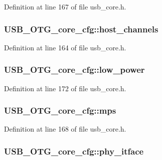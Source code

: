 Definition at line 167 of file usb\-\_\-core.\-h.

\hypertarget{struct_u_s_b___o_t_g__core__cfg_ac8f7d81fd5b4d38828bbed6a7a6bb350}{
\subsubsection[{host\-\_\-channels}]{ U\-S\-B\-\_\-\-O\-T\-G\-\_\-core\-\_\-cfg\-::host\-\_\-channels}}\label{struct_u_s_b___o_t_g__core__cfg_ac8f7d81fd5b4d38828bbed6a7a6bb350}


Definition at line 164 of file usb\-\_\-core.\-h.

\hypertarget{struct_u_s_b___o_t_g__core__cfg_a215bf00bd42b18f4a76c514b298a09ce}{
\subsubsection[{low\-\_\-power}]{ U\-S\-B\-\_\-\-O\-T\-G\-\_\-core\-\_\-cfg\-::low\-\_\-power}}\label{struct_u_s_b___o_t_g__core__cfg_a215bf00bd42b18f4a76c514b298a09ce}


Definition at line 172 of file usb\-\_\-core.\-h.

\hypertarget{struct_u_s_b___o_t_g__core__cfg_a02b0cfc0fde1fd37e24f00cd98580fdc}{
\subsubsection[{mps}]{ U\-S\-B\-\_\-\-O\-T\-G\-\_\-core\-\_\-cfg\-::mps}}\label{struct_u_s_b___o_t_g__core__cfg_a02b0cfc0fde1fd37e24f00cd98580fdc}


Definition at line 168 of file usb\-\_\-core.\-h.

\hypertarget{struct_u_s_b___o_t_g__core__cfg_a445a98eff3b50a35adf8a255c3b3ef54}{
\subsubsection[{phy\-\_\-itface}]{ U\-S\-B\-\_\-\-O\-T\-G\-\_\-core\-\_\-cfg\-::phy\-\_\-itface}}\label{struct_u_s_b___o_t_g__core__cfg_a445a98eff3b50a35adf8a255c3b3ef54}


